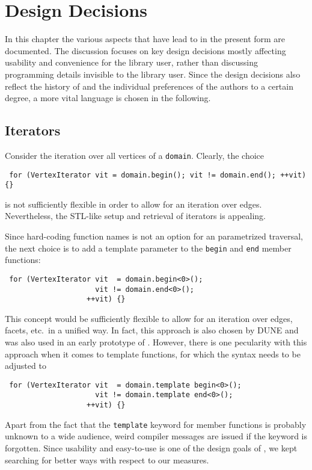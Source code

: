 \chapter{Design Decisions} \label{chap:design}
In this chapter the various aspects that have lead to {\ViennaGrid} in the present form are documented.
The discussion focuses on key design decisions mostly affecting usability and convenience for the library user,
rather than discussing programming details invisible to the library user. Since the design decisions also reflect
the history of {\ViennaGrid} and the individual preferences of the authors to a certain degree, a more vital language is chosen in the following.

 \section{Iterators}
 Consider the iteration over all vertices of a \lstinline|domain|. Clearly, the choice
 \begin{lstlisting}
 for (VertexIterator vit = domain.begin(); vit != domain.end(); ++vit) {}
 \end{lstlisting}
 is not sufficiently flexible in order to allow for an iteration over edges.
 Nevertheless, the STL-like setup and retrieval of iterators is appealing.

 Since hard-coding function names is not an option for an parametrized traversal,
 the next choice is to add a template parameter to the \lstinline|begin| and \lstinline|end| member functions:
 \begin{lstlisting}
 for (VertexIterator vit  = domain.begin<0>();
                     vit != domain.end<0>();
                   ++vit) {}
 \end{lstlisting}
 This concept would be sufficiently flexible to allow for an iteration over edges, facets, etc.~in a unified way.
 In fact, this approach is also chosen by DUNE \cite{DUNE} and was also used in an early prototype of {\ViennaGrid}.
 However, there is one pecularity with this approach when it comes to template functions, for which the syntax needs to be adjusted to
 \begin{lstlisting}
 for (VertexIterator vit  = domain.template begin<0>();
                     vit != domain.template end<0>();
                   ++vit) {}
 \end{lstlisting}
 Apart from the fact that the \lstinline|template| keyword for member functions is probably unknown to a wide audience, 
 weird compiler messages are issued if the keyword is forgotten. Since usability and easy-to-use is one of the design goals of {\ViennaGrid},
 we kept searching for better ways with respect to our measures.

